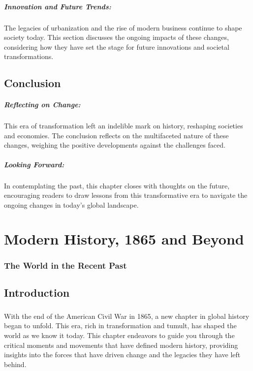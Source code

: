 \documentclass[a4paper,12pt]{book}
\begin{document}
\paragraph{Innovation and Future Trends:}
The legacies of urbanization and the rise of modern business continue to shape society today. This section discusses the ongoing impacts of these changes, considering how they have set the stage for future innovations and societal transformations.

\section*{Conclusion}

\paragraph{Reflecting on Change:}
This era of transformation left an indelible mark on history, reshaping societies and economies. The conclusion reflects on the multifaceted nature of these changes, weighing the positive developments against the challenges faced.

\paragraph{Looking Forward:}
In contemplating the past, this chapter closes with thoughts on the future, encouraging readers to draw lessons from this transformative era to navigate the ongoing changes in today’s global landscape.

\chapter{Modern History, 1865 and Beyond}
\subsection*{The World in the Recent Past}

\section*{Introduction}
\paragraph{}
With the end of the American Civil War in 1865, a new chapter in global history began to unfold. This era, rich in transformation and tumult, has shaped the world as we know it today. This chapter endeavors to guide you through the critical moments and movements that have defined modern history, providing insights into the forces that have driven change and the legacies they have left behind.
\end{document}
